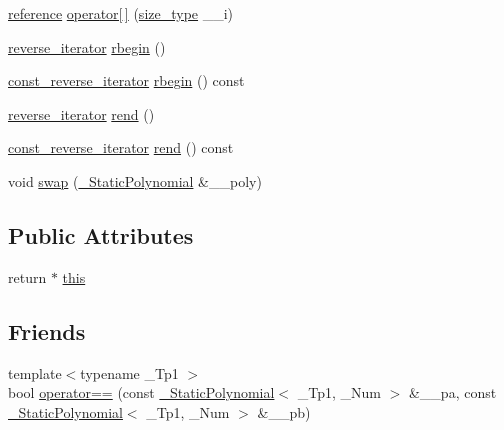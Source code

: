 \begin{DoxyCompactItemize}
\item 
\hyperlink{class____gnu__cxx_1_1__StaticPolynomial_a280562caf2d2f392b5b73cac1e64e8ed}{reference} \hyperlink{class____gnu__cxx_1_1__StaticPolynomial_a7f109a6648a8b21a596ed3433b57e76c}{operator\mbox{[}$\,$\mbox{]}} (\hyperlink{class____gnu__cxx_1_1__StaticPolynomial_a3384ce6a956ad398fc995e6ee53b2b18}{size\+\_\+type} \+\_\+\+\_\+i)
\item 
\hyperlink{class____gnu__cxx_1_1__StaticPolynomial_ab6a9fab0cd102db2a5bfd00fe9f35e4d}{reverse\+\_\+iterator} \hyperlink{class____gnu__cxx_1_1__StaticPolynomial_ac508b08cbd7c83901e4982516a9e8ce9}{rbegin} ()
\item 
\hyperlink{class____gnu__cxx_1_1__StaticPolynomial_a03b96649dc974fc6829342659325b7cb}{const\+\_\+reverse\+\_\+iterator} \hyperlink{class____gnu__cxx_1_1__StaticPolynomial_ae6737a13b22aa1f7289c9f3882fe0b62}{rbegin} () const
\item 
\hyperlink{class____gnu__cxx_1_1__StaticPolynomial_ab6a9fab0cd102db2a5bfd00fe9f35e4d}{reverse\+\_\+iterator} \hyperlink{class____gnu__cxx_1_1__StaticPolynomial_a588b23e51d1ac50bee019f336193db38}{rend} ()
\item 
\hyperlink{class____gnu__cxx_1_1__StaticPolynomial_a03b96649dc974fc6829342659325b7cb}{const\+\_\+reverse\+\_\+iterator} \hyperlink{class____gnu__cxx_1_1__StaticPolynomial_aab031f4e8c0ac973f13de88564461ada}{rend} () const
\item 
void \hyperlink{class____gnu__cxx_1_1__StaticPolynomial_abdce33b479623cdfd003b9c73b1fd2d7}{swap} (\hyperlink{class____gnu__cxx_1_1__StaticPolynomial}{\+\_\+\+Static\+Polynomial} \&\+\_\+\+\_\+poly)
\end{DoxyCompactItemize}
\subsection*{Public Attributes}
\begin{DoxyCompactItemize}
\item 
return $\ast$ \hyperlink{class____gnu__cxx_1_1__StaticPolynomial_a4de3c06513ac6f8677fe098213a89fff}{this}
\end{DoxyCompactItemize}
\subsection*{Friends}
\begin{DoxyCompactItemize}
\item 
{\footnotesize template$<$typename \+\_\+\+Tp1 $>$ }\\bool \hyperlink{class____gnu__cxx_1_1__StaticPolynomial_ae1001829bb41fadbad006ab00bc35c14}{operator==} (const \hyperlink{class____gnu__cxx_1_1__StaticPolynomial}{\+\_\+\+Static\+Polynomial}$<$ \+\_\+\+Tp1, \+\_\+\+Num $>$ \&\+\_\+\+\_\+pa, const \hyperlink{class____gnu__cxx_1_1__StaticPolynomial}{\+\_\+\+Static\+Polynomial}$<$ \+\_\+\+Tp1, \+\_\+\+Num $>$ \&\+\_\+\+\_\+pb)
\end{DoxyCompactItemize}


